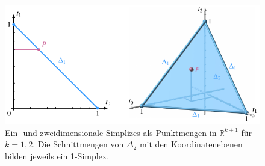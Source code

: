 %
%
%
\begin{figure}
\centering
\includegraphics{chapters/120-topologie/images/simplex.pdf}
\caption{Ein- und zweidimensionale Simplizes als Punktmengen in
$\mathbb{R}^{k+1}$ für $k=1,2$.
Die Schnittmengen von $\Delta_2$ mit den Koordinatenebenen bilden
jeweils ein 1-Simplex.
\label{buch:topologie:simplex:fig:simplex}}
\end{figure}
